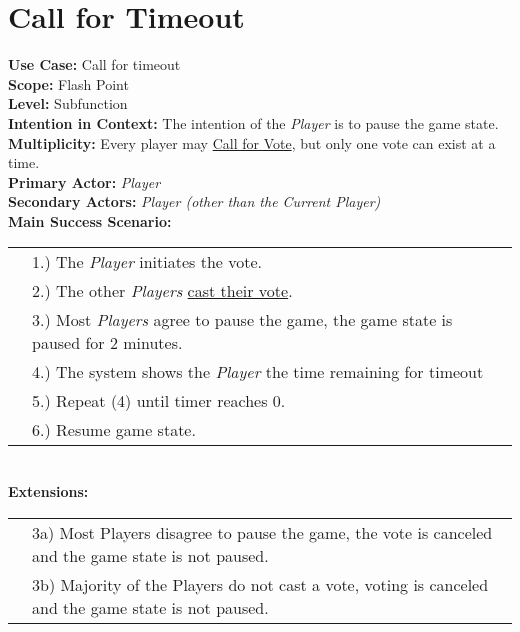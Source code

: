 \documentclass{article}
\begin{document}
	\section*{Call for Timeout}
	\textbf{Use Case:} Call for timeout\\
	\textbf{Scope:} Flash Point\\
	\textbf{Level:} Subfunction\\
	\textbf{Intention in Context:} The intention of the \textit{Player} is to pause the game state.\\
	\textbf{Multiplicity: } Every player may \underline{Call for Vote}, but only one vote can exist at a time.\\
	\textbf{Primary Actor:} \textit{Player}\\
	\textbf{Secondary Actors:} \textit{Player (other than the Current Player)}\\
	\textbf{Main Success Scenario:}\\
	\begin{tabular}{l l}
		&1.) The \textit{Player} initiates the vote.\\
		&2.) The other \textit{Players} \underline{cast their vote}.\\
		&3.) Most \textit{Players} agree to pause the game, the game state is paused for 2 minutes.\\
		&4.) The system shows the \textit{Player} the time remaining for timeout\\
		&5.) Repeat (4) until timer reaches 0.\\
		&6.) Resume game state.\\
	\end{tabular}\\
	\textbf{Extensions:}\\
	\begin{tabular}{l l}
		&3a) Most Players disagree to pause the game, the vote is canceled and the game state is not paused.\\
		&3b) Majority of the Players do not cast a vote, voting is canceled and the game state is not paused.
	\end{tabular}
\end{document}
